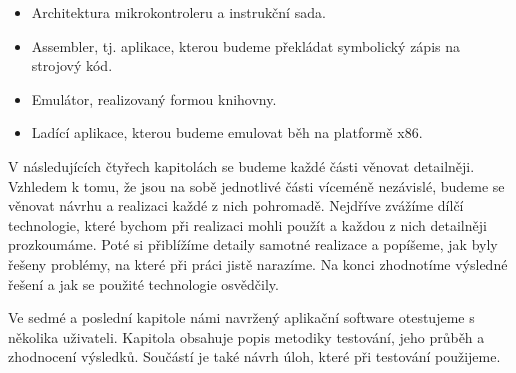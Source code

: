 \begin{introduction}
\begin{itemize}
	\item Architektura mikrokontroleru a instrukční sada.
	\item Assembler, tj. aplikace, kterou budeme překládat symbolický zápis na strojový kód.
	\item Emulátor, realizovaný formou knihovny.
	\item Ladící aplikace, kterou budeme emulovat běh na platformě x86.
\end{itemize}

V následujících čtyřech kapitolách se budeme každé části věnovat detailněji. Vzhledem k tomu, že jsou na sobě jednotlivé části víceméně nezávislé, budeme se věnovat návrhu a realizaci každé z nich pohromadě. Nejdříve zvážíme dílčí technologie, které bychom při realizaci mohli použít a každou z nich detailněji prozkoumáme. Poté si přiblížíme detaily samotné realizace a popíšeme, jak byly řešeny problémy, na které při práci jistě narazíme. Na konci zhodnotíme výsledné řešení a jak se použité technologie osvědčily.

Ve sedmé a poslední kapitole námi navržený aplikační software otestujeme s několika uživateli. Kapitola obsahuje popis metodiky testování, jeho průběh a zhodnocení výsledků. Součástí je také návrh úloh, které při testování použijeme.

\end{introduction}
